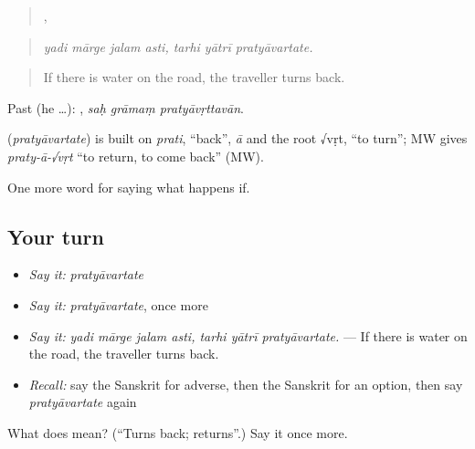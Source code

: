 \begin{quote}
   ,   
\end{quote}

\begin{quote}
\emph{yadi mārge jalam asti, tarhi yātrī pratyāvartate.}
\end{quote}

\begin{quote}
If there is water on the road, the traveller turns back.
\end{quote}

Past (he …):   , \emph{saḥ grāmaṃ pratyāvṛttavān}.

\begin{cousinweb}
\textbf{} (\emph{pratyāvartate}) is built on \emph{prati}, \textquotedblleft{}back\textquotedblright{}, \emph{ā} and the root √vṛt, \textquotedblleft{}to turn\textquotedblright{}; MW gives \emph{praty-ā-√vṛt} \textquotedblleft{}to return, to come back\textquotedblright{} (MW).
\end{cousinweb}

\begin{grammarlens}[title={What you've built}]
One more word for saying what happens if.
\end{grammarlens}

\subsection*{Your turn}
\begin{itemize}
\raggedright
  \item \emph{Say it:} \emph{pratyāvartate}
  \item \emph{Say it:} \emph{pratyāvartate}, once more
  \item \emph{Say it:} \emph{yadi mārge jalam asti, tarhi yātrī pratyāvartate.} — If there is water on the road, the traveller turns back.
  \item \emph{Recall:} say the Sanskrit for adverse, then the Sanskrit for an option, then say \emph{pratyāvartate} again
\end{itemize}

\begin{tcolorbox}[breakable,colback=teal!4,colframe=teal!35!black,title={Before you move on}]
What does  mean? (\textquotedblleft{}Turns back; returns\textquotedblright{}.) Say it once more.
\end{tcolorbox}
